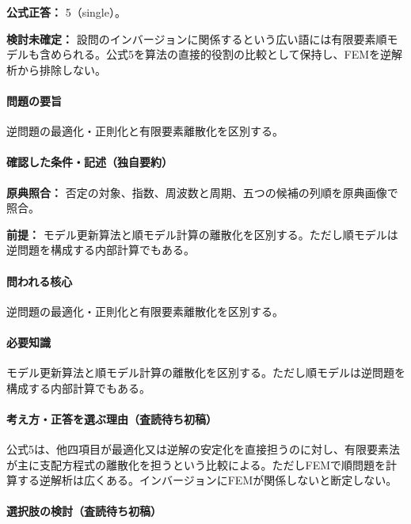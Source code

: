 \textbf{公式正答：} 5（single）。

\par\textbf{検討未確定：} 設問のインバージョンに関係するという広い語には有限要素順モデルも含められる。公式5を算法の直接的役割の比較として保持し、FEMを逆解析から排除しない。

\paragraph{問題の要旨} 逆問題の最適化・正則化と有限要素離散化を区別する。

\paragraph{確認した条件・記述（独自要約）}\mbox{}\par

\noindent\textbf{原典照合：} 否定の対象、指数、周波数と周期、五つの候補の列順を原典画像で照合。\par

\noindent\textbf{前提：} モデル更新算法と順モデル計算の離散化を区別する。ただし順モデルは逆問題を構成する内部計算でもある。\par

\paragraph{問われる核心} 逆問題の最適化・正則化と有限要素離散化を区別する。

\paragraph{必要知識} モデル更新算法と順モデル計算の離散化を区別する。ただし順モデルは逆問題を構成する内部計算でもある。

\paragraph{考え方・正答を選ぶ理由（査読待ち初稿）} 公式5は、他四項目が最適化又は逆解の安定化を直接担うのに対し、有限要素法が主に支配方程式の離散化を担うという比較による。ただしFEMで順問題を計算する逆解析は広くある。インバージョンにFEMが関係しないと断定しない。

\paragraph{選択肢の検討（査読待ち初稿）}\mbox{}\par

